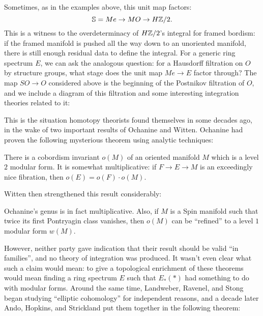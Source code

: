Sometimes, as in the examples above, this unit map factors: \[\mathbb S = Me \to MO \to H\mathbb Z/2.\]  This is a witness to the overdeterminacy of $H\mathbb Z/2$'s integral for framed bordism: if the framed manifold is pushed all the way down to an unoriented manifold, there is still enough residual data to define the integral.  For a generic ring spectrum $E$, we can ask the analogous question: for a Hausdorff filtration on $O$ by structure groups, what stage does the unit map $Me \to E$ factor through?  The map $SO \to O$ considered above is the beginning of the Postnikov filtration of $O$, and we include a diagram of this filtration and some interesting integration theories related to it:
\begin{center}
\end{center}

This is the situation homotopy theorists found themselves in some decades ago, in the wake of two important results of Ochanine and Witten. Ochanine had proven the following mysterious theorem using analytic techniques:

\begin{theorem}[Ochanine]
There is a cobordism invariant $o(M)$ of an oriented manifold $M$ which is a level $2$ modular form. It is somewhat multiplicative: if $F \to E \to M$ is an exceedingly nice fibration, then $o(E) = o(F) \cdot o(M)$.
\end{theorem}

\noindent Witten then strengthened this result considerably:

\begin{theorem}[Witten]
Ochanine's genus is in fact multiplicative. Also, if $M$ is a Spin manifold such that twice its first Pontryagin class vanishes, then $o(M)$ can be ``refined'' to a level $1$ modular form $w(M)$.
\end{theorem}

\noindent However, neither party gave indication that their result should be valid ``in families'', and no theory of integration was produced.  It wasn't even clear what such a claim would mean: to give a topological enrichment of these theorems would mean finding a ring spectrum $E$ such that $E_*(*)$ had something to do with modular forms.  Around the same time, Landweber, Ravenel, and Stong began studying ``elliptic cohomology'' for independent reasons, and a decade later Ando, Hopkins, and Strickland put them together in the following theorem:

